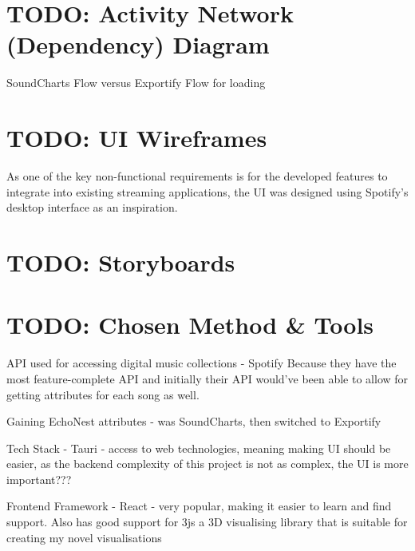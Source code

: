 \section{TODO: Activity Network (Dependency) Diagram} %
SoundCharts Flow versus Exportify Flow for loading 

\section{TODO: UI Wireframes}%
As one of the key non-functional requirements is for the developed features to integrate into existing streaming applications, the UI was designed using Spotify's desktop interface as an inspiration.

\section{TODO: Storyboards}%

\section{TODO: Chosen Method \& Tools}%
API used for accessing digital music collections - Spotify
Because they have the most feature-complete API and initially their API would've been able to allow for getting attributes for each song as well.

Gaining EchoNest attributes - was SoundCharts, then switched to Exportify

Tech Stack - Tauri - access to web technologies, meaning making UI should be easier, as the backend complexity of this project is not as complex, the UI is more important??? %

Frontend Framework - React - very popular, making it easier to learn and find support. Also has good support for 3js a 3D visualising library that is suitable for creating my novel visualisations

